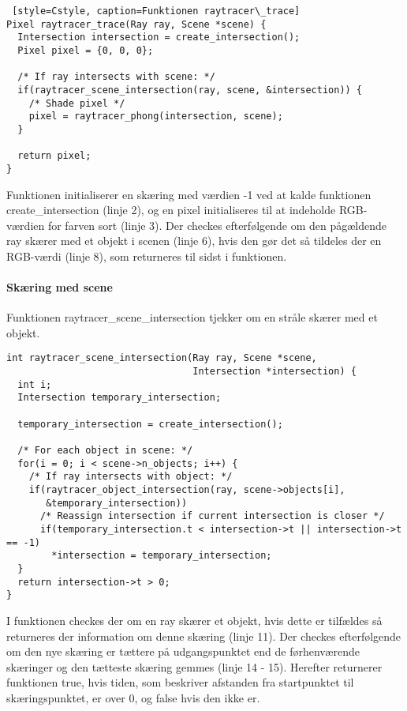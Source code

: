 \begin{lstlisting} [style=Cstyle, caption=Funktionen raytracer\_trace]
Pixel raytracer_trace(Ray ray, Scene *scene) {
  Intersection intersection = create_intersection();
  Pixel pixel = {0, 0, 0};
  
  /* If ray intersects with scene: */
  if(raytracer_scene_intersection(ray, scene, &intersection)) {
    /* Shade pixel */
    pixel = raytracer_phong(intersection, scene);
  }
  
  return pixel;
}
\end{lstlisting}
Funktionen initialiserer en skæring med værdien -1 ved at kalde funktionen create\_intersection (linje 2), og en pixel initialiseres til at indeholde RGB-værdien for farven sort (linje 3). Der checkes efterfølgende om den pågældende ray skærer med et objekt i scenen (linje 6), hvis den gør det så tildeles der en RGB-værdi (linje 8), som returneres til sidst i funktionen. 

\paragraph{Skæring med scene}

Funktionen raytracer\_scene\_intersection tjekker om en stråle skærer med et objekt.

\begin{lstlisting}[style=Cstyle, caption=Funktionen raytracer\_scene\_intersection]
int raytracer_scene_intersection(Ray ray, Scene *scene, 
                                 Intersection *intersection) {
  int i;
  Intersection temporary_intersection;

  temporary_intersection = create_intersection();

  /* For each object in scene: */
  for(i = 0; i < scene->n_objects; i++) {
    /* If ray intersects with object: */
    if(raytracer_object_intersection(ray, scene->objects[i], 
       &temporary_intersection))
      /* Reassign intersection if current intersection is closer */
      if(temporary_intersection.t < intersection->t || intersection->t == -1)
        *intersection = temporary_intersection;
  }
  return intersection->t > 0;
}
\end{lstlisting}

I funktionen checkes der om en ray skærer et objekt, hvis dette er tilfældes så returneres der information om denne skæring (linje 11). Der checkes efterfølgende om den nye skæring er tættere på udgangspunktet end de førhenværende skæringer og den tætteste skæring gemmes (linje 14 - 15). Herefter returnerer funktionen true, hvis tiden, som beskriver afstanden fra startpunktet  til skæringspunktet, er over 0, og false hvis den ikke er.



